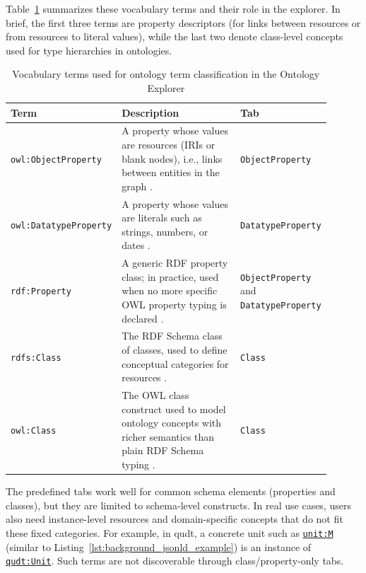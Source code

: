 Table~\ref{tab:rdf_authoring_panel:ontology_term_types} summarizes these vocabulary terms and their role in the explorer. In brief, the first three terms are property descriptors (for links between resources or from resources to literal values), while the last two denote class-level concepts used for type hierarchies in ontologies.

\begin{table}[htbp]
  \centering
  \small
  \renewcommand{\arraystretch}{1.3}
  \caption{Vocabulary terms used for ontology term classification in the Ontology Explorer}
  \label{tab:rdf_authoring_panel:ontology_term_types}
  \begin{tabular}{p{0.24\linewidth} p{0.5\linewidth} p{0.16\linewidth}}
    \toprule
    \textbf{Term} & \textbf{Description} & \textbf{Tab} \\
    \midrule
    \texttt{owl:ObjectProperty} & A property whose values are resources (IRIs or blank nodes), i.e., links between entities in the graph \cite{owl2_overview,owl2_primer}. & \texttt{ObjectProperty} \\
    \texttt{owl:DatatypeProperty} & A property whose values are literals such as strings, numbers, or dates \cite{owl2_overview,owl2_primer}. & \texttt{DatatypeProperty} \\
    \texttt{rdf:Property} & A generic RDF property class; in practice, used when no more specific OWL property typing is declared \cite{rdf_schema2014}. & \texttt{ObjectProperty} and \texttt{DatatypeProperty} \\
    \texttt{rdfs:Class} & The RDF Schema class of classes, used to define conceptual categories for resources \cite{rdf_schema2014}. & \texttt{Class} \\
    \texttt{owl:Class} & The OWL class construct used to model ontology concepts with richer semantics than plain RDF Schema typing \cite{owl2_overview,owl2_primer}. & \texttt{Class} \\
    \bottomrule
  \end{tabular}
\end{table}

The predefined tabs work well for common schema elements (properties and classes), but they are limited to schema-level constructs. In real use cases, users also need instance-level resources and domain-specific concepts that do not fit these fixed categories. For example, in \gls{qudt}, a concrete unit such as \href{https://qudt.org/vocab/unit/M}{\texttt{unit:M}} (similar to Listing~\ref{lst:background_jsonld_example}) is an instance of \href{https://qudt.org/schema/qudt/}{\texttt{qudt:Unit}}. Such terms are not discoverable through class/property-only tabs.

